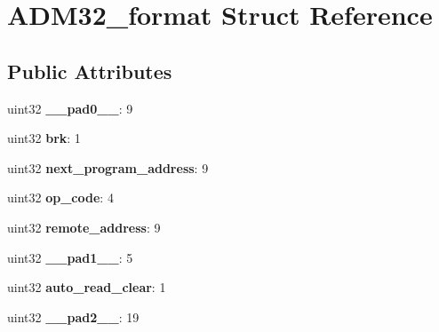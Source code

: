 \hypertarget{structADM32__format}{}\section{A\+D\+M32\+\_\+format Struct Reference}
\label{structADM32__format}
\subsection*{Public Attributes}
\begin{DoxyCompactItemize}
\item 
\mbox{\label{structADM32__format_ae91b685c152c9b38d58107a7a72ca56a}} 
uint32 {\bfseries \+\_\+\+\_\+pad0\+\_\+\+\_\+}\+: 9
\item 
\mbox{\label{structADM32__format_a3a042d9beeb37ba59db47be5678b24ad}} 
uint32 {\bfseries brk}\+: 1
\item 
\mbox{\label{structADM32__format_acf1c52d1ede84b6a795d7e8700946866}} 
uint32 {\bfseries next\+\_\+program\+\_\+address}\+: 9
\item 
\mbox{\label{structADM32__format_a04e9e419c9411849066c48894a4cc9bf}} 
uint32 {\bfseries op\+\_\+code}\+: 4
\item 
\mbox{\label{structADM32__format_a73b249c21ac892df150eaab9384e9ef2}} 
uint32 {\bfseries remote\+\_\+address}\+: 9
\item 
\mbox{\label{structADM32__format_a6d06124dd72cb32a32085bf12935622c}} 
uint32 {\bfseries \+\_\+\+\_\+pad1\+\_\+\+\_\+}\+: 5
\item 
\mbox{\label{structADM32__format_a35e8b1dd4b1293f28b21f910650e6a1b}} 
uint32 {\bfseries auto\+\_\+read\+\_\+clear}\+: 1
\item 
\mbox{\label{structADM32__format_a793145b38c093943e4003d81c34d01b0}} 
uint32 {\bfseries \+\_\+\+\_\+pad2\+\_\+\+\_\+}\+: 19
\item 
\mbox{\label{structADM32__format_aed6733137435614b2f6d935a55f93616}} 

\end{DoxyCompactItemize}
